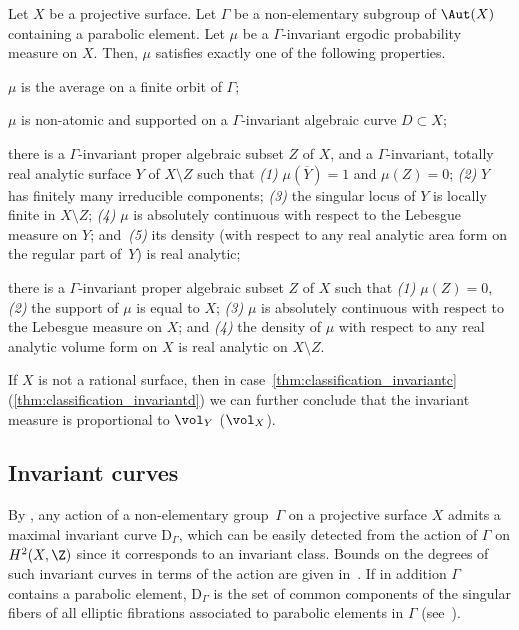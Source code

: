 \begin{thm}\label{thm:classification_invariant}
Let $X$ be a projective surface. Let $\Gamma$ be a non-elementary subgroup of $\Aut(X)$ containing a parabolic element. Let $\mu$ be a $\Gamma$-invariant ergodic probability measure on $X$.
Then, $\mu$ satisfies exactly one of the following properties.

\begin{enumeratea}
\item\label{thm:classification_invarianta} $\mu$ is the average on a finite orbit of $\Gamma$;
\item\label{thm:classification_invariantb} $\mu$ is non-atomic and supported on a $\Gamma$-invariant algebraic curve $D\subset X$;
\item\label{thm:classification_invariantc} there is a $\Gamma$-invariant proper algebraic subset $Z$ of $X$, and a $\Gamma$-invariant,
totally real analytic surface $Y$ of
$X\setminus Z$ such that {\em {(1)}} $\mu(\overline{Y}) = 1$ and $\mu(Z)=0$; {\em {(2)}} $Y$ has finitely many irreducible components;
{\em {(3)}} the singular locus of $Y$ is locally finite in $X\setminus Z$;
{\em {(4)}} $\mu$
is absolutely continuous with respect to the Lebesgue measure on $Y$; and~{\em {(5)}} its density (with respect to any real analytic area form on the regular part of~$Y$)
is real analytic;
\item\label{thm:classification_invariantd} there is a $\Gamma$-invariant proper algebraic subset $Z$ of $X$ such that {\em {(1)}} $\mu(Z)=0$, {\em {(2)}} the support of $\mu$ is equal to $X$; {\em {(3)}} $\mu$ is absolutely continuous with respect to the Lebesgue measure on $X$; and {\em {(4)}} the density of $\mu$ with respect to any real analytic
volume form on $X$ is real analytic on $X\setminus Z$.
\end{enumeratea}
If $X$ is not a rational surface, then in case~\eqref{thm:classification_invariantc} (\resp \eqref{thm:classification_invariantd}) we can further conclude that the invariant measure is proportional to $\vol_Y$ (\resp $\vol_X$).
\end{thm}

\subsection{Invariant curves}\label{subs:invariant_curves}
By \cite[Lem.\,2.12]{stiffness}, any action of a non-elementary group~$\Gamma$ on a
projective surface $X$ admits a maximal invariant curve $\mathrm D_\Gamma$,
which can be easily detected from the action of $\Gamma$ on $H^2(X, \Z)$
since it corresponds to an invariant class. Bounds on the degrees of such invariant curves in terms of the action are given in~\hbox{\cite[\S 3]{finite_orbits}}. If in addition $\Gamma$
contains a parabolic element, $\mathrm D_\Gamma$ is the set of common components of the singular fibers of all elliptic fibrations associated to
parabolic elements in $\Gamma$ (see~\cite[\S 4.1]{invariant}).

